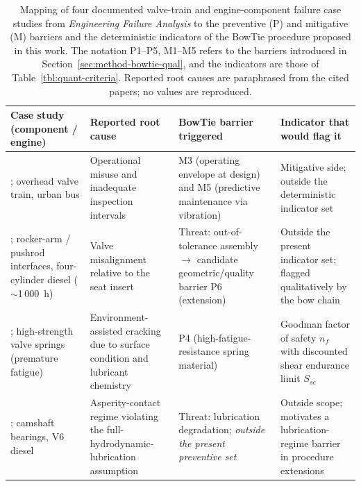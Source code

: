 \begin{table}[!htbp]
\caption{Mapping of four documented valve-train and engine-component failure case studies from \textit{Engineering Failure Analysis} to the preventive (P) and mitigative (M) barriers and the deterministic indicators of the BowTie procedure proposed in this work. The notation P1--P5, M1--M5 refers to the barriers introduced in Section~\ref{sec:method-bowtie-qual}, and the indicators are those of Table~\ref{tbl:quant-criteria}. Reported root causes are paraphrased from the cited papers; no values are reproduced.}\label{tbl:related-cases}
\renewcommand{\arraystretch}{1.15}
\begin{tabular}{@{}p{}p{}p{}p{}@{}}
\toprule
Case study (component / engine) & Reported root cause & BowTie barrier triggered & Indicator that would flag it \\
\midrule
\citet{velezgodino2019overheadvalvetrain}; overhead valve train, urban bus & Operational misuse and inadequate inspection intervals & M3 (operating envelope at design) and M5 (predictive maintenance via vibration) & Mitigative side; outside the deterministic indicator set \\
\addlinespace
\citet{soffritti2018wornvalvetrain}; rocker-arm / pushrod interfaces, four-cylinder diesel ($\sim$1\,000~h) & Valve misalignment relative to the seat insert & Threat: out-of-tolerance assembly $\rightarrow$ candidate geometric/quality barrier P6 (extension) & Outside the present indicator set; flagged qualitatively by the bow chain \\
\addlinespace
\citet{xing2021valvespringEAC}; high-strength valve springs (premature fatigue) & Environment-assisted cracking due to surface condition and lubricant chemistry & P4 (high-fatigue-resistance spring material) & Goodman factor of safety $n_{f}$ with discounted shear endurance limit $S_{se}$ \\
\addlinespace
\citet{zhao2023camshaftV6}; camshaft bearings, V6 diesel & Asperity-contact regime violating the full-hydrodynamic-lubrication assumption & Threat: lubrication degradation; \emph{outside the present preventive set} & Outside scope; motivates a lubrication-regime barrier in procedure extensions \\
\bottomrule
\end{tabular}
\end{table}

